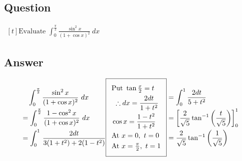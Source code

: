 \documentclass[17pt]{extarticle}
\begin{document}
\noindent
\begin{fleqn} 


\section{Question} 

$\begin{aligned}[t] 
\text{Evaluate \ } \int_{0}^{\frac{\pi}{2}} \frac{\sin^2x}{(1 + \cos x)^2}\ dx
\end{aligned}$

\subsection*{Answer}
\begin{equation} \nonumber
\begin{alignedat}{4}
& \quad  \int_{0}^{\frac{\pi}{2}} \frac{\sin^2x}{(1 + \cos x)^2}\ dx\\
&= \int_{0}^{\frac{\pi}{2}} \frac{1 -\cos^2x}{(1 + \cos x)^2}\ dx\\
&= \int_{0}^{1}\,\frac{2dt}{3(1+t^2) + 2(1-t^2)}\\
\end{alignedat}
\begin{alignedat}{4}
    \addtolength{\fboxsep}{5pt}
    \boxed{
     \begin{split}
       & \text{Put } \tan \tfrac{x}{2}=t\\
       & \ \therefore dx =\frac{2dt}{1 + t^2}\\
        & \cos x =  \frac{1 - t^2}{1 + t^2}\\
         & \text{At } x=0,\  t=0\\
         & \text{At } x=\tfrac{\pi}{2},\  t=1\\
        \end{split}
     }\end{alignedat}
\begin{alignedat}{4}
&= \int_{0}^{1}\frac{2dt}{5+t^2}\\
&= \left[\frac{2}{\sqrt{5}}\tan^{-1}\left(\frac{t}{\sqrt{5}}\right)\right]_{0}^{1}\\
&= \frac{2}{\sqrt{5}}\tan^{-1}\left(\frac{1}{\sqrt{5}}\right)\\
\end{alignedat}
\end{equation}


\end{fleqn}
\end{document}
